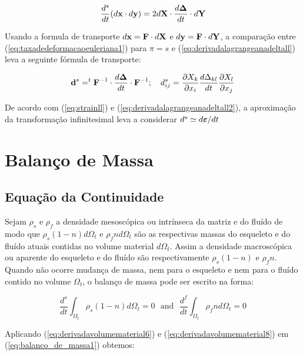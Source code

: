 \documentclass[
	11pt, %
	fleqn, %
	a4paper, %
]{LegrandOrangeBook}
\begin{document}
\begin{equation}
	\label{eq:derivadalagrangeanadeltall}	
	\dfrac{d^s}{dt}(d\textbf{x} \cdot d\textbf{y}) = 2d\textbf{X} \cdot \dfrac{d\bm{\Delta}}{dt} \cdot d\textbf{Y}
\end{equation}

Usando a formula de transporte $d\textbf{x} = \textbf{F} \cdot d\textbf{X}$ e $d\textbf{y} = \textbf{F} \cdot d\textbf{Y}$, a comparação entre (\ref{eq:taxadedeformacaoeuleriana1}) para $\pi = s$ e (\ref{eq:derivadalagrangeanadeltall}) leva a seguinte fórmula de transporte:

\begin{equation}
	\label{eq:derivadalagrangeanadeltall2}	
	\textbf{d}^s = ^{t}\textbf{F}^{-1} \cdot \dfrac{d\bm{\Delta}}{dt} \cdot \textbf{F}^{-1}; ~~~ d_{ij}^s = \dfrac{\partial X_k}{\partial x_i}\dfrac{d\Delta_{kl}}{dt}\dfrac{\partial X_l}{\partial x_j}
\end{equation}

De acordo com (\ref{eq:strainll}) e (\ref{eq:derivadalagrangeanadeltall2}), a aproximação da transformação infinitesimal leva a considerar $d^s \simeq d\bm{\varepsilon}/dt$

\section{Balanço de Massa}

\subsection{Equação da Continuidade}

Sejam $\rho_s$ e $\rho_f$ a densidade mesoscópica ou intrínseca da matriz e do fluído de modo que $\rho_s(1-n)d\Omega_t$ e $\rho_f n d\Omega_t$ são as respectivas massas do esqueleto e do fluído atuais contidas no volume material $d\Omega_t$. Assim a densidade macroscópica ou aparente do esqueleto e do fluído são respectivamente $\rho_s(1-n)$ e $\rho_f n$. Quando não ocorre mudança de massa, nem para o esqueleto e nem para o fluído contido no volume $\Omega_t$, o balanço de massa pode ser escrito na forma:

\begin{equation}
	\label{eq:balanco_de_massa1}	
	\dfrac{d^s}{dt}\int_{\Omega_t}\rho_s(1-n)d\Omega_t = 0~~~ \text{and}~~~\dfrac{d^f}{dt}\int_{\Omega_t}\rho_fnd\Omega_t = 0 
\end{equation}

Aplicando (\ref{eq:derivadavolumematerial6}) e (\ref{eq:derivadavolumematerial8}) em (\ref{eq:balanco_de_massa1}) obtemos:
\end{document}
